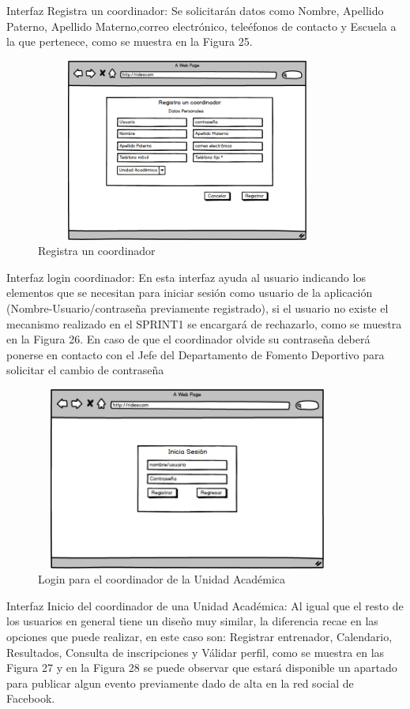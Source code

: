 	\noindent Interfaz Registra un coordinador: Se solicitarán datos como Nombre, Apellido Paterno, Apellido Materno,correo electrónico, teleéfonos de contacto y Escuela a la que pertenece, como se muestra en la Figura 25.
	\begin{figure}[hbt!]
		\centering
		\includegraphics[width=10cm, height=6cm]{Imagenes/Disenos/p7Registrocoordinador.png}
		\caption{Registra un coordinador}
	\end{figure}
	
	\noindent Interfaz login coordinador: En esta interfaz ayuda al usuario indicando los elementos que se necesitan para iniciar sesión como usuario de la aplicación (Nombre-Usuario/contraseña previamente registrado), si el usuario no existe el mecanismo realizado en el SPRINT1 se encargará de rechazarlo, como se muestra en la Figura 26. En caso de que el coordinador olvide su contraseña deberá ponerse en contacto con el Jefe del Departamento de Fomento Deportivo para solicitar el cambio de contraseña \pagebreak
	\begin{figure}[hbt!]
		\centering
		\includegraphics[width=10cm, height=6cm]{Imagenes/Disenos/p8LogincoordUA.png}
		\caption{Login para el coordinador de la Unidad Académica}
	\end{figure}
	
	\noindent Interfaz  Inicio del coordinador de una Unidad Académica: Al igual que el resto de los usuarios en general tiene un diseño muy similar, la diferencia recae en las opciones que puede realizar, en este caso son: Registrar entrenador, Calendario, Resultados, Consulta de inscripciones y Válidar perfil, como se muestra en las Figura 27 y en la Figura 28 se puede observar que estará disponible un apartado para publicar algun evento previamente dado de alta en la red social de Facebook.
	
